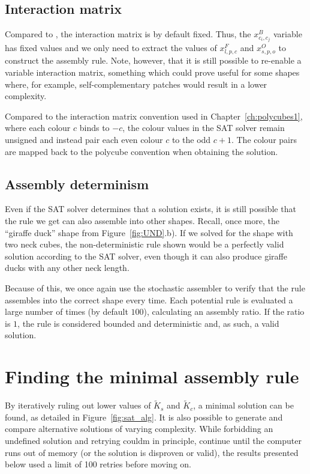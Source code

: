 \subsection{Interaction matrix}
Compared to \cite{romano2020designing}, the interaction matrix is by default fixed. Thus, the \(x_{c_i,c_j}^{B}\) variable has fixed values and we only need to extract the values of \(x_{l,p,c}^{F}\) and \(x_{s,p,o}^{O}\) to construct the assembly rule. Note, however, that it is still possible to re-enable a variable interaction matrix, something which could prove useful for some shapes where, for example, self-complementary patches would result in a lower complexity.

Compared to the interaction matrix convention used in Chapter~\ref{ch:polycubes1}, where each colour \(c\) binds to \(-c\), the colour values in the SAT solver remain unsigned and instead pair each even colour \(c\) to the odd \(c+1\). The colour pairs are mapped back to the polycube convention when obtaining the solution.

\subsection{Assembly determinism}
Even if the SAT solver determines that a solution exists, it is still possible that the rule we get can also assemble into other shapes. Recall, once more, the ``giraffe duck'' shape from Figure~\ref{fig:UND}.b). If we solved for the shape with two neck cubes, the non-deterministic rule shown would be a perfectly valid solution according to the SAT solver, even though it can also produce giraffe ducks with any other neck length.

Because of this, we once again use the stochastic assembler to verify that the rule assembles into the correct shape every time. Each potential rule is evaluated a large number of times (by default \(100\)), calculating an assembly ratio. If the ratio is \(1\), the rule is considered bounded and deterministic and, as such, a valid solution.


\section{Finding the minimal assembly rule}

By iteratively ruling out lower values of \(\widetilde{K}_s\) and \(\widetilde{K}_c\), a minimal solution can be found, as detailed in Figure~\ref{fig:sat_alg}. It is also possible to generate and compare alternative solutions of varying complexity. While forbidding an undefined solution and retrying couldm in principle, continue until the computer runs out of memory (or the solution is disproven or valid), the results presented below used a limit of 100 retries before moving on.

